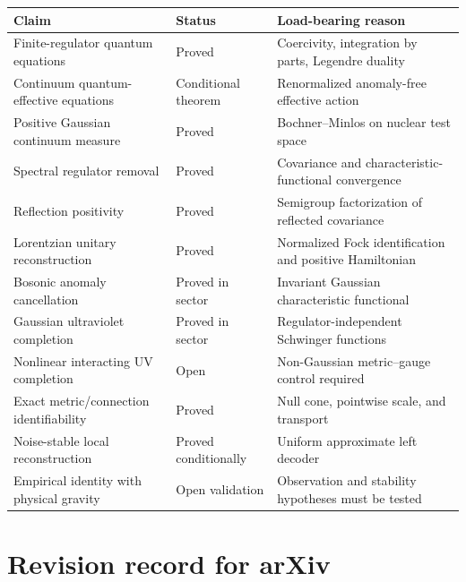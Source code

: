\begin{center}
\small
\begin{tabular}{p{}p{}p{}}
\toprule
Claim & Status & Load-bearing reason\\
\midrule
Finite-regulator quantum equations & Proved & Coercivity, integration by parts, Legendre duality\\
Continuum quantum-effective equations & Conditional theorem & Renormalized anomaly-free effective action\\
Positive Gaussian continuum measure & Proved & Bochner--Minlos on nuclear test space\\
Spectral regulator removal & Proved & Covariance and characteristic-functional convergence\\
Reflection positivity & Proved & Semigroup factorization of reflected covariance\\
Lorentzian unitary reconstruction & Proved & Normalized Fock identification and positive Hamiltonian\\
Bosonic anomaly cancellation & Proved in sector & Invariant Gaussian characteristic functional\\
Gaussian ultraviolet completion & Proved in sector & Regulator-independent Schwinger functions\\
Nonlinear interacting UV completion & Open & Non-Gaussian metric--gauge control required\\
Exact metric/connection identifiability & Proved & Null cone, pointwise scale, and transport\\
Noise-stable local reconstruction & Proved conditionally & Uniform approximate left decoder\\
Empirical identity with physical gravity & Open validation & Observation and stability hypotheses must be tested\\
\bottomrule
\end{tabular}
\end{center}

\section{Revision record for arXiv}

